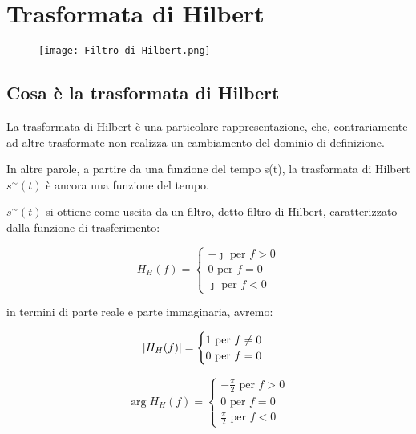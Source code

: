 \chapter{Trasformata di Hilbert} 

\begin{figure}[h]
    \centering
    \texttt{[image: Filtro di Hilbert.png]}
\end{figure}  

\newpage 

\section{Cosa è la trasformata di Hilbert} 

La trasformata di Hilbert è una particolare rappresentazione, che, contrariamente ad altre trasformate 
non realizza un cambiamento del dominio di definizione. \newline 

In altre parole, a partire da una funzione del tempo s(t), la trasformata di Hilbert $s^{\sim} (t)$ è ancora una funzione del tempo. \newline 

$s^{\sim} (t)$ si ottiene come uscita da un filtro, detto filtro di Hilbert, caratterizzato dalla funzione di trasferimento: 

{
    \Large 
    \begin{equation}
        H_H (f) = 
        \begin{cases}
            -\jmath \text{ per } f>0  \\ 
            0 \text{ per } f = 0 \\ 
            \jmath \text{ per } f<0
        \end{cases}
    \end{equation}
}

in termini di parte reale e parte immaginaria, avremo: 

{
    \Large 
    \begin{equation}
        \abs{H_H (f)} = 
        \begin{cases}
            1 \text{ per } f \neq 0 \\ 
            0 \text{ per } f = 0
        \end{cases}
    \end{equation}
}

{
    \Large 
    \begin{equation}
        \arg{H_H (f)} = 
        \begin{cases}
            -\frac{\pi}{2} \text{ per } f > 0 \\ 
            0 \text{ per } f = 0 \\ 
            \frac{\pi}{2} \text{ per } f < 0
        \end{cases}
    \end{equation}
}

